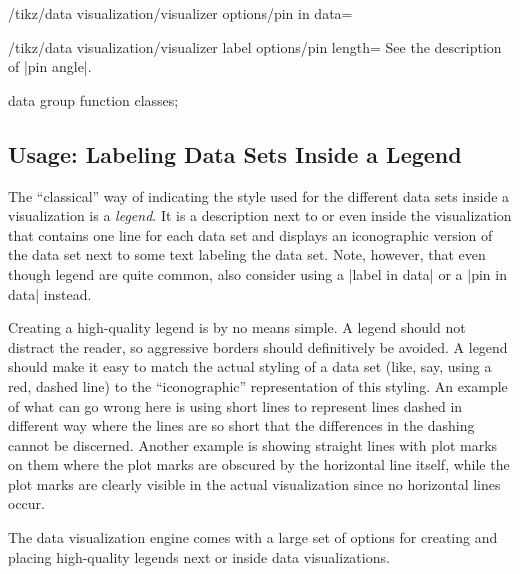 \begin{key}{/tikz/data visualization/visualizer options/pin in data=}
    \begin{key}{/tikz/data visualization/visualizer label options/pin length=}
        See the description of |pin angle|.
    \end{key}
\begin{codeexample}[width=6.3cm]
\tikz \datavisualization [
  school book axes,
  x axis={label=$x$},
  visualize as smooth line/.list={log, lin, squared, exp},
  every data set label/.append style={text colored},
  log=    {pin in data={text'=$\log x$, when=y is -1}},
  lin=    {pin in data={text=$x/2$, when=x is 2,
                        pin length=1ex}},
  squared={pin in data={text=$x^2$, when=x is 1.1,
                        pin angle=230}},
  exp=    {label in data={text=$e^x$, when=x is -2}},
  style sheet=vary hue]
data group {function classes};
\end{codeexample}
    \end{key}


\subsection{Usage: Labeling Data Sets Inside a Legend}

The ``classical'' way of indicating the style used for the different data sets
inside a visualization is a \emph{legend}. It is a description next to or even
inside the visualization that contains one line for each data set and displays
an iconographic version of the data set next to some text labeling the data
set. Note, however, that even though legend are quite common, also consider
using a |label in data| or a |pin in data| instead.

Creating a high-quality legend is by no means simple. A legend should not
distract the reader, so aggressive borders should definitively be avoided. A
legend should make it easy to match the actual styling of a data set (like,
say, using a red, dashed line) to the ``iconographic'' representation of this
styling. An example of what can go wrong here is using short lines to represent
lines dashed in different way where the lines are so short that the differences
in the dashing cannot be discerned. Another example is showing straight lines
with plot marks on them where the plot marks are obscured by the horizontal
line itself, while the plot marks are clearly visible in the actual
visualization since no horizontal lines occur.

The data visualization engine comes with a large set of options for creating
and placing high-quality legends next or inside data visualizations.


